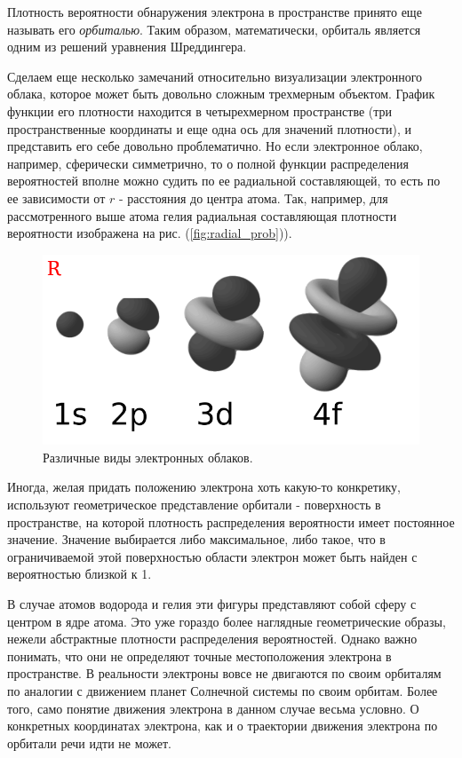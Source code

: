 Плотность вероятности обнаружения электрона в пространстве принято еще называть его \textit{орбиталью}.
Таким образом, математически, орбиталь является одним из решений уравнения Шреддингера.

Сделаем еще несколько замечаний относительно визуализации электронного облака, которое может быть довольно сложным трехмерным объектом.
График функции его плотности находится в четырехмерном пространстве (три пространственные координаты и еще одна ось для значений плотности), и представить его себе довольно проблематично.
Но если электронное облако, например, сферически симметрично, то о полной функции распределения вероятностей вполне можно судить по ее радиальной составляющей, то есть по ее зависимости от $r$ - расстояния до центра атома.
Так, например, для рассмотренного выше атома гелия радиальная составляющая плотности вероятности изображена на рис. (\ref{fig:radial_prob})).

\begin{figure}[t!]
   \centering
   \includegraphics[scale=0.9]{images/electron_clouds_1}
   \caption{Различные виды электронных облаков.}
   \label{fig:electron_clouds_1}
\end{figure}

Иногда, желая придать положению электрона хоть какую-то конкретику, используют геометрическое представление орбитали - поверхность в пространстве, на которой плотность распределения вероятности имеет постоянное значение.
Значение выбирается либо максимальное, либо такое, что в ограничиваемой этой поверхностью области электрон может быть найден с вероятностью близкой к 1.

В случае атомов водорода и гелия эти фигуры представляют собой сферу с центром в ядре атома.
Это уже гораздо более наглядные геометрические образы, нежели абстрактные плотности распределения вероятностей.
Однако важно понимать, что они не определяют точные местоположения электрона в пространстве. 
В реальности электроны вовсе не двигаются по своим орбиталям по аналогии с движением планет Солнечной системы по своим орбитам.
Более того, само понятие движения электрона в данном случае весьма условно.
О конкретных координатах электрона, как и о траектории движения электрона по орбитали речи идти не может.

